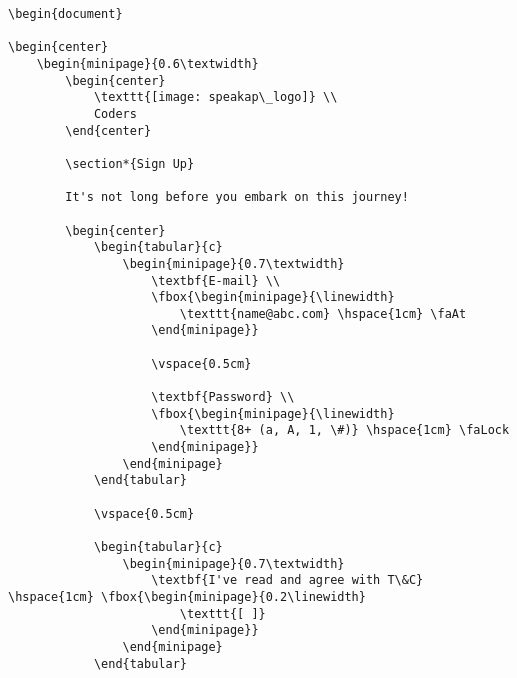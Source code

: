 \documentclass{article}
\begin{document}
\begin{verbatim}
\begin{document}

\begin{center}
    \begin{minipage}{0.6\textwidth}
        \begin{center}
            \texttt{[image: speakap\_logo]} \\
            Coders
        \end{center}
        
        \section*{Sign Up}

        It's not long before you embark on this journey!

        \begin{center}
            \begin{tabular}{c}
                \begin{minipage}{0.7\textwidth}
                    \textbf{E-mail} \\
                    \fbox{\begin{minipage}{\linewidth}
                        \texttt{name@abc.com} \hspace{1cm} \faAt
                    \end{minipage}}

                    \vspace{0.5cm}

                    \textbf{Password} \\
                    \fbox{\begin{minipage}{\linewidth}
                        \texttt{8+ (a, A, 1, \#)} \hspace{1cm} \faLock
                    \end{minipage}}
                \end{minipage}
            \end{tabular}

            \vspace{0.5cm}

            \begin{tabular}{c}
                \begin{minipage}{0.7\textwidth}
                    \textbf{I've read and agree with T\&C} \hspace{1cm} \fbox{\begin{minipage}{0.2\linewidth}
                        \texttt{[ ]}
                    \end{minipage}}
                \end{minipage}
            \end{tabular}


\end{verbatim}
\end{document}
